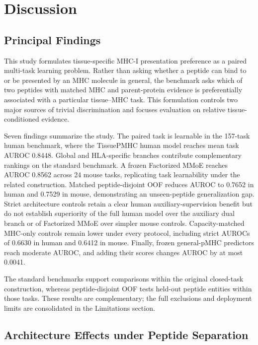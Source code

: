 \section{Discussion}

\subsection{Principal Findings}

This study formulates tissue-specific MHC-I presentation preference as a paired multi-task learning problem. Rather than asking whether a peptide can bind to or be presented by an MHC molecule in general, the benchmark asks which of two peptides with matched MHC and parent-protein evidence is preferentially associated with a particular tissue--MHC task. This formulation controls two major sources of trivial discrimination and focuses evaluation on relative tissue-conditioned evidence.

Seven findings summarize the study. The paired task is learnable in the 157-task human benchmark, where the TissuePMHC human model reaches mean task AUROC 0.8448. Global and HLA-specific branches contribute complementary rankings on the standard benchmark. A frozen Factorized MMoE reaches AUROC 0.8562 across 24 mouse tasks, replicating task learnability under the related construction. Matched peptide-disjoint OOF reduces AUROC to 0.7652 in human and 0.7529 in mouse, demonstrating an unseen-peptide generalization gap. Strict architecture controls retain a clear human auxiliary-supervision benefit but do not establish superiority of the full human model over the auxiliary dual branch or of Factorized MMoE over simpler mouse controls. Capacity-matched MHC-only controls remain lower under every protocol, including strict AUROCs of 0.6630 in human and 0.6412 in mouse. Finally, frozen general-pMHC predictors reach moderate AUROC, and adding their scores changes AUROC by at most 0.0041.

The standard benchmarks support comparisons within the original closed-task construction, whereas peptide-disjoint OOF tests held-out peptide entities within those tasks. These results are complementary; the full exclusions and deployment limits are consolidated in the Limitations section.

\subsection{Architecture Effects under Peptide Separation}

